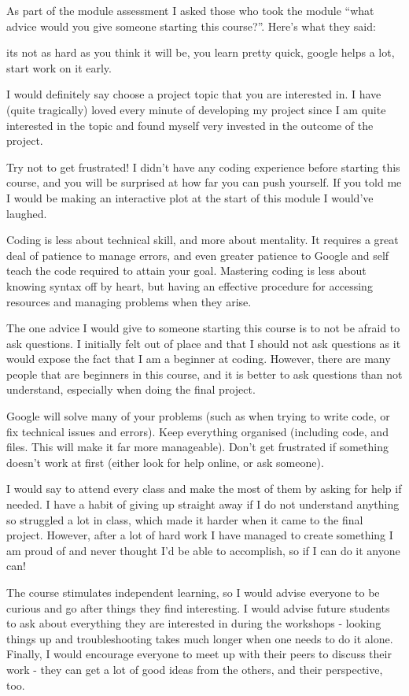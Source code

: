 \documentclass[
]{book}
\begin{document}
As part of the module assessment I asked those who took the module ``what advice would you give someone starting this course?''. Here's what they said:

its not as hard as you think it will be, you learn pretty quick, google helps a lot, start work on it early.

I would definitely say choose a project topic that you are interested in. I have (quite tragically) loved every minute of developing my project since I am quite interested in the topic and found myself very invested in the outcome of the project.

Try not to get frustrated! I didn't have any coding experience before starting this course, and you will be surprised at how far you can push yourself. If you told me I would be making an interactive plot at the start of this module I would've laughed.

Coding is less about technical skill, and more about mentality. It requires a great deal of patience to manage errors, and even greater patience to Google and self teach the code required to attain your goal. Mastering coding is less about knowing syntax off by heart, but having an effective procedure for accessing resources and managing problems when they arise.

The one advice I would give to someone starting this course is to not be afraid to ask questions. I initially felt out of place and that I should not ask questions as it would expose the fact that I am a beginner at coding. However, there are many people that are beginners in this course, and it is better to ask questions than not understand, especially when doing the final project.

Google will solve many of your problems (such as when trying to write code, or fix technical issues and errors). Keep everything organised (including code, and files. This will make it far more manageable). Don't get frustrated if something doesn't work at first (either look for help online, or ask someone).

I would say to attend every class and make the most of them by asking for help if needed. I have a habit of giving up straight away if I do not understand anything so struggled a lot in class, which made it harder when it came to the final project. However, after a lot of hard work I have managed to create something I am proud of and never thought I'd be able to accomplish, so if I can do it anyone can!

The course stimulates independent learning, so I would advise everyone to be curious and go after things they find interesting. I would advise future students to ask about everything they are interested in during the workshops - looking things up and troubleshooting takes much longer when one needs to do it alone. Finally, I would encourage everyone to meet up with their peers to discuss their work - they can get a lot of good ideas from the others, and their perspective, too.
\end{document}
